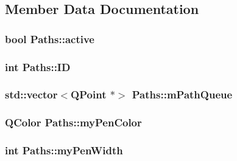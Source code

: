 \subsection{Member Data Documentation}
\hypertarget{classPaths_aa3333ae27bae8f24a2ef84812371e655}{
\subsubsection[{active}]{\setlength{\rightskip}{0pt plus 5cm}bool {\bf Paths::active}}}
\label{classPaths_aa3333ae27bae8f24a2ef84812371e655}
\hypertarget{classPaths_a54282ab5ada2fefcd9344d28e73db4c1}{
\subsubsection[{ID}]{\setlength{\rightskip}{0pt plus 5cm}int {\bf Paths::ID}}}
\label{classPaths_a54282ab5ada2fefcd9344d28e73db4c1}
\hypertarget{classPaths_a53a3768ea7270f0fab3d9838db3ff327}{
\subsubsection[{mPathQueue}]{\setlength{\rightskip}{0pt plus 5cm}std::vector$<$QPoint $\ast$$>$ {\bf Paths::mPathQueue}}}
\label{classPaths_a53a3768ea7270f0fab3d9838db3ff327}
\hypertarget{classPaths_a60780e00c7dfd69bf1e8db95217ee77e}{
\subsubsection[{myPenColor}]{\setlength{\rightskip}{0pt plus 5cm}QColor {\bf Paths::myPenColor}}}
\label{classPaths_a60780e00c7dfd69bf1e8db95217ee77e}
\hypertarget{classPaths_a8ed757e23d6850088af1fb98f50f9f92}{
\subsubsection[{myPenWidth}]{\setlength{\rightskip}{0pt plus 5cm}int {\bf Paths::myPenWidth}}}
